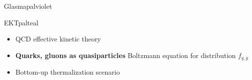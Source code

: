 \documentclass[aspectratio=169,11pt,usenames,dvipsnames]{beamer}
\begin{document}
\begin{frame}[noframenumbering]
\begin{columns}[onlytextwidth,t]
\begin{center}
\begin{custombox2}{Glasma}{palviolet}
\begin{varwidth}{0.76\textwidth}
\begin{itemize}
                \end{itemize}
                \end{varwidth}
            \end{custombox2}
            \begin{custombox2}{EKT}{palteal}
                \small
                \begin{varwidth}{0.9\textwidth}
                \begin{itemize}\itemsep0em 
                    \item QCD effective kinetic theory
                    \item {\bfseries Quarks, gluons as quasiparticles}
                        {\color{lightgray}\scriptsize Boltzmann equation for distribution $f_{q,g}$}
                    \item Bottom-up thermalization scenario
                    
                \end{itemize}
                \end{varwidth}
            \end{custombox2}


\end{center}
\end{columns}
\end{frame}
\end{document}
